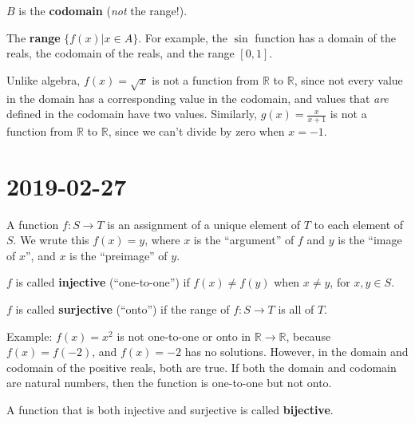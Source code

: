 \documentclass{article}
\theoremstyle{definition}
\begin{document}
$B$ is the \textbf{codomain} (\textit{not} the range!).

The \textbf{range} $\{f(x) | x \in A\}$. For example, the $\sin$ function
has a domain of the reals, the codomain of the reals, and the range $[0,1]$.

Unlike algebra, $f(x)=\sqrt{x}$ is not a function from $\mathbb{R}$ to
$\mathbb{R}$, since not every value in the domain has a corresponding value
in the codomain, and values that \textit{are} defined in the codomain have
two values. Similarly, $g(x) = \frac{x}{x+1}$ is not a function from
$\mathbb{R}$ to $\mathbb{R}$, since we can't divide by zero when $x=-1$.


\section{2019-02-27}

A function $f: S \to T$ is an assignment of a unique element of $T$ to each
element of $S$. We wrute this $f(x)=y$, where $x$ is the ``argument'' of $f$
and $y$ is the ``image of $x$'', and $x$ is the ``preimage'' of $y$.

$f$ is called \textbf{injective} (``one-to-one'') if $f(x) \neq f(y)$ when
$x \neq y$, for $x,y \in S$. 

$f$ is called \textbf{surjective} (``onto'') if the range of $f: S \to T$ is
all of $T$. 

Example: $f(x)=x^2$ is not one-to-one or onto in $\mathbb{R} \to \mathbb{R}$,
because $f(x)=f(-2)$, and $f(x)=-2$ has no solutions. However, in the domain
and codomain of the positive reals, both are true. If both the domain and 
codomain are natural numbers, then the function is one-to-one but not onto.

A function that is both injective and surjective is called \textbf{bijective}.
\end{document}
